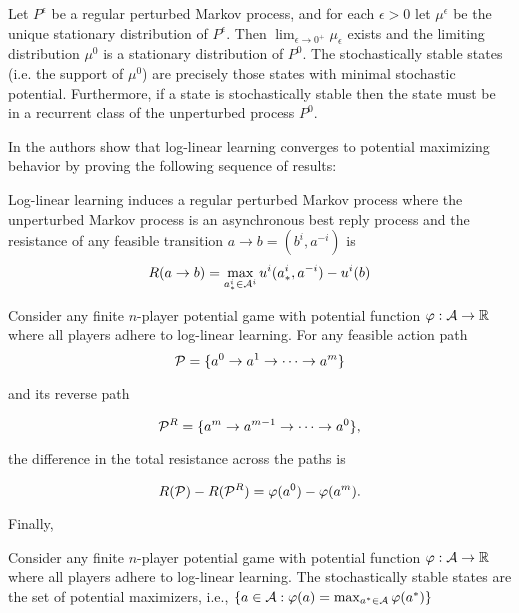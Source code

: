 \begin{thm}\cite{young1993evolution}
Let $P^{\epsilon}$ be a regular perturbed Markov process, and for each $\epsilon > 0$ let $\mu^{\epsilon}$ be the unique stationary distribution of $P^{\epsilon}$. Then $\lim_{\epsilon \rightarrow 0^+} \mu_{\epsilon}$ exists and the limiting distribution $\mu^0$ is a stationary distribution of $P^0$. The stochastically stable states (i.e. the support of $\mu^0$) are precisely those states with minimal stochastic potential. Furthermore, if a state is stochastically stable then the state must be in a recurrent class of the unperturbed process $P^0$.
\label{thm:evconv}
\end{thm}

In \cite{marden2012revisiting} the authors show that log-linear learning converges to potential maximizing behavior by proving the following sequence of results:

\begin{lem}
Log-linear learning induces a regular perturbed Markov process where the unperturbed Markov process is an asynchronous best reply process and the resistance of any feasible transition $a \rightarrow b = (b^i, a^{-i})$ is
$$
R(a \rightarrow b) = \max_{a^i_* \in \AA^i} u^i(a^i_*, a^{-i}) - u^i(b)
$$
\end{lem}


\begin{lem}
Consider any finite $n$-player potential game with potential function $\phi: \AA \rightarrow \R$ where all players adhere to log-linear learning. For any feasible action path
$$
\PP = \{a^0 \rightarrow a^1 \rightarrow \cdots \rightarrow a^m\}
$$

\noindent and its reverse path

$$
\PP^R = \{a^m \rightarrow a^{m-1} \rightarrow \cdots \rightarrow a^0\}, 
$$

\noindent the difference in the total resistance across the paths is

$$
R(\PP) - R(\PP^R) = \phi(a^0) - \phi(a^m).
$$
\end{lem}

Finally,

\begin{prop}
Consider any finite $n$-player potential game with potential function $\phi: \AA \rightarrow \R$ where all players adhere to log-linear learning. The stochastically stable states are the set of potential maximizers, i.e., $\{ a \in \AA : \phi(a) = \max_{a^* \in \AA} \phi(a^*)  \}$
\end{prop}




